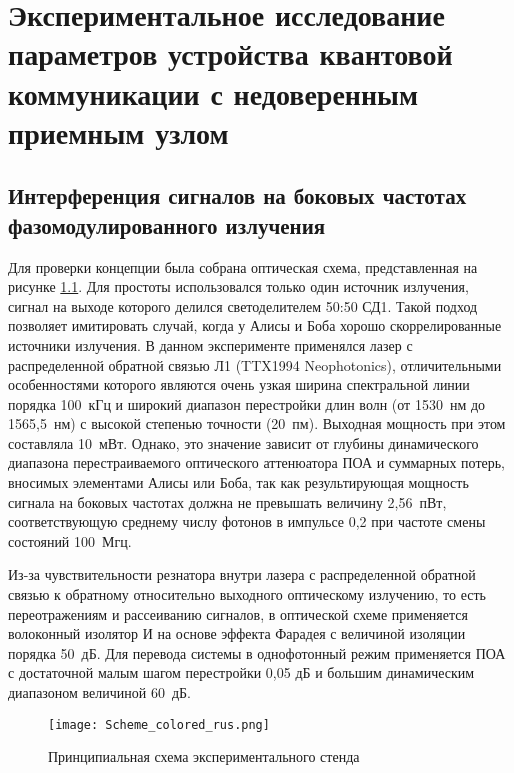 \chapter{Экспериментальное исследование параметров устройства квантовой коммуникации с недоверенным приемным узлом} \label{ch:ch5}
\section{Интерференция сигналов на боковых частотах фазомодулированного излучения} \label{sec:ch5/sec1}

Для проверки концепции была собрана оптическая схема, представленная на рисунке \ref{fig:RF_sin}. Для простоты использовался только один источник излучения, сигнал на выходе которого делился светоделителем 50:50 СД1. Такой подход позволяет имитировать случай, когда у Алисы и Боба хорошо скоррелированные источники излучения. В данном эксперименте применялся лазер с распределенной обратной связью Л1 (TTX1994 Neophotonics), отличительными особенностями которого являются очень узкая ширина спектральной линии порядка 100~кГц и широкий диапазон перестройки длин волн (от 1530~нм до 1565,5~нм) с высокой степенью точности (20~пм). Выходная мощность при этом составляла 10~мВт. Однако, это значение зависит от глубины динамического диапазона перестраиваемого оптического аттенюатора ПОА и суммарных потерь, вносимых элементами Алисы или Боба, так как результирующая мощность сигнала на боковых частотах должна не превышать величину 2,56~пВт, соответствующую среднему числу фотонов в импульсе 0,2 при частоте смены состояний 100~Мгц.   

Из-за чувствительности резнатора внутри лазера с распределенной обратной связью к обратному относительно выходного оптическому излучению, то есть переотражениям и рассеиванию сигналов, в оптической схеме применяется волоконный изолятор И на основе эффекта Фарадея с величиной изоляции порядка 50~дБ. Для перевода системы в однофотонный режим применяется ПОА с достаточной малым шагом перестройки 0,05 дБ и большим динамическим диапазоном величиной 60~дБ.  

 \begin{figure}[ht]
  \centering
  \texttt{[image: Scheme\_colored\_rus.png]}
  \caption{Принципиальная схема экспериментального стенда}
  \label{fig:RF_sin}
\end{figure}

